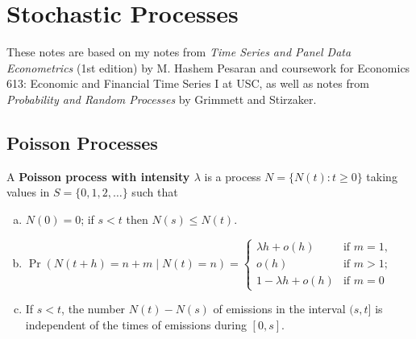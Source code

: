 %
%
%
%
%
%
%
%
%
%
%
%
%
%


\section{Stochastic Processes}

These notes are based on my notes from \textit{Time Series and Panel Data Econometrics} (1st edition) by M. Hashem Pesaran and coursework for Economics 613: Economic and Financial Time Series I at USC, as well as notes from \textit{Probability and Random Processes} by Grimmett and Stirzaker.

\subsection{Poisson Processes}\label{stoch.pois.proc.sec}

\begin{definition}\label{stoch.pois.proc.def}A \textbf{Poisson process with intensity \(\lambda\)} is a process \(N=\{N(t): t \geq 0 \}\) taking values in \(S=\{0, 1, 2, \ldots \}\) such that 

\begin{enumerate}[(a)]

\item \(N(0) = 0\); if \(s < t\) then \(N(s) \leq N(t)\).

\item \(\Pr(N(t+h) = n+m \mid N(t) =n) = \begin{cases}
\lambda h + o(h) & \text{if } m = 1, \\
o(h) & \text{if } m > 1; \\
1 - \lambda h + o(h) & \text{if } m=0
\end{cases}
\)

\item If \(s < t\), the number \(N(t) - N(s)\) of emissions in the interval \((s, t]\) is independent of the times of emissions during \([0,s]\).

\end{enumerate}

\end{definition}

